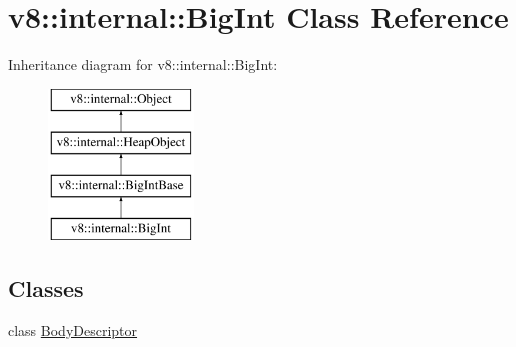 \hypertarget{classv8_1_1internal_1_1BigInt}{}\section{v8\+:\+:internal\+:\+:Big\+Int Class Reference}
\label{classv8_1_1internal_1_1BigInt}
Inheritance diagram for v8\+:\+:internal\+:\+:Big\+Int\+:\begin{figure}[H]
\begin{center}
\leavevmode
\includegraphics[height=4.000000cm]{classv8_1_1internal_1_1BigInt}
\end{center}
\end{figure}
\subsection*{Classes}
\begin{DoxyCompactItemize}
\item 
class \mbox{\hyperlink{classv8_1_1internal_1_1BigInt_1_1BodyDescriptor}{Body\+Descriptor}}
\end{DoxyCompactItemize}
